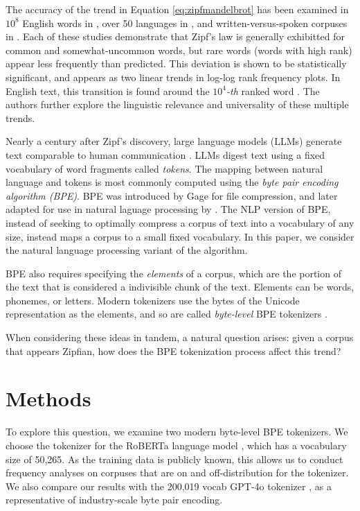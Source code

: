 \documentclass[11pt]{article}
\begin{document}
The accuracy of the trend in Equation \ref{eq:zipfmandelbrot} has been examined in $10^8$ English words in \cite{cancho2000}, over 50 languages in \cite{yu2018zipfslaw50languages}, and written-versus-spoken corpuses in \cite{lin2015scalinglawshumanspeech}. Each of these studies demonstrate that Zipf's law is generally exhibitted for common and somewhat-uncommon words, but rare words (words with high rank) appear less frequently than predicted. This deviation is shown to be statistically significant, and appears as two linear trends in log-log rank frequency plots. In English text, this transition is found around the $10^4$\textit{-th} ranked word \cite{cancho2000} \cite{yu2018zipfslaw50languages}. The authors further explore the linguistic relevance and universality of these multiple trends. 

Nearly a century after Zipf's discovery, large language models (LLMs) generate text comparable to human communication \cite{llmturingtest}. LLMs digest text using a fixed vocabulary of word fragments called \textit{tokens}. The mapping between natural language and tokens is most commonly computed using the \textit{byte pair encoding algorithm (BPE)}. BPE was introduced by Gage \cite{bpegage} for file compression, and later adapted for use in natural laguage processing by \cite{sennrich2016neuralmachinetranslationrare}. The NLP version of BPE, instead of seeking to optimally compress a corpus of text into a vocabulary of any size, instead maps a corpus to a small fixed vocabulary. In this paper, we consider the natural language processing variant of the algorithm. 

BPE also requires specifying the \textit{elements} of a corpus, which are the portion of the text that is considered a indivisible chunk of the text. Elements can be words, phonemes, or letters. Modern tokenizers use the bytes of the Unicode representation as the elements, and so are called \textit{byte-level} BPE tokenizers \cite{radford2019language}. 

When considering these ideas in tandem, a natural question arises: given a corpus that appears Zipfian, how does the BPE tokenization process affect this trend?

\section{Methods}

To explore this question, we examine two modern byte-level BPE tokenizers. We choose the tokenizer for the RoBERTa language model \cite{liu2019robertarobustlyoptimizedbert}, which has a vocabulary size of 50,265. As the training data is publicly known, this allows us to conduct frequency analyses on corpuses that are on and off-distribution for the tokenizer.  We also compare our results with the 200,019 vocab GPT-4o tokenizer \cite{openai2024gpt4technicalreport}, as a representative of industry-scale byte pair encoding. 
\end{document}
